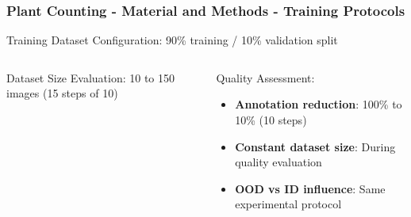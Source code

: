 \documentclass[aspectratio=43]{beamer}
\begin{document}
\begin{frame}
    \frametitle{Plant Counting - Material and Methods - Training Protocols}
  
    \begin{block}{Training Dataset Configuration:}
        \small
        90\% training / 10\% validation split
    \end{block}
    
    \begin{columns}
        \begin{column}{0.5\textwidth}
            \begin{block}{Dataset Size Evaluation:}
                \scriptsize
                10 to 150 images (15 steps of 10)
            \end{block}
        \end{column}
        
        \begin{column}{0.5\textwidth}
            \begin{block}{Quality Assessment:}
                \scriptsize
                \begin{itemize}
                    \item \textbf{Annotation reduction}: 100\% to 10\% (10 steps)
                    \item \textbf{Constant dataset size}: During quality evaluation
                    \item \textbf{OOD vs ID influence}: Same experimental protocol
                \end{itemize}
            \end{block}
        \end{column}
    \end{columns}
\end{frame}
\end{document}
